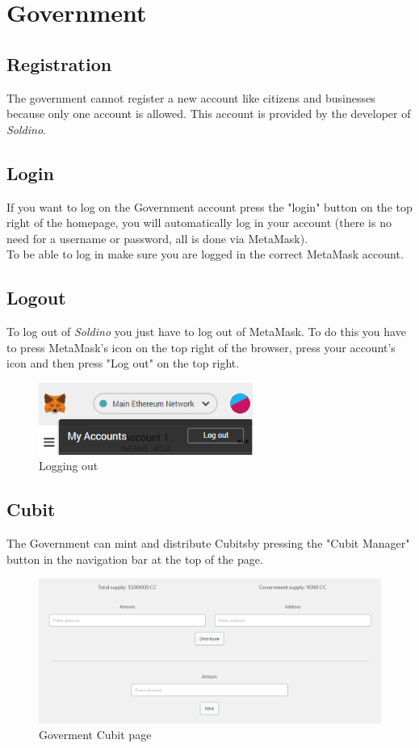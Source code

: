 \section{Government}
	\subsection{Registration}
	The government cannot register a new account like citizens and 
	businesses because only one account is allowed. This account is provided 
	by the developer of \textit{Soldino}.
	\subsection{Login}
	If you want to log on the Government account press the "login" button on the 
	top right of the homepage, you will automatically log in your account 
	(there is no need for a username or password, all is done via MetaMask). 
	\\To be able to log in make sure you are logged in the correct MetaMask\glosp 
	account.
	\subsection{Logout}
	To log out of \textit{Soldino} you just have to log out of 
	MetaMask\glosp. To do this you have to press MetaMask's icon on the top 
	right of the browser, press your account's icon and then press "Log out"
	on the top right.
	\begin{figure}[H]
		\includegraphics[width=7cm]{res/images/logout_metamask.png}
		\centering
		\caption{Logging out}
	\end{figure}
\pagebreak
	\subsection{Cubit}
	The Government can mint and distribute Cubits\glosp by pressing the "Cubit 
	Manager" button in the navigation bar at the top of the page.
	\begin{figure}[H]
		\includegraphics[width=15cm]{res/images/cubit_mint.png}
		\centering
		\caption{Goverment Cubit page}
	\end{figure}
